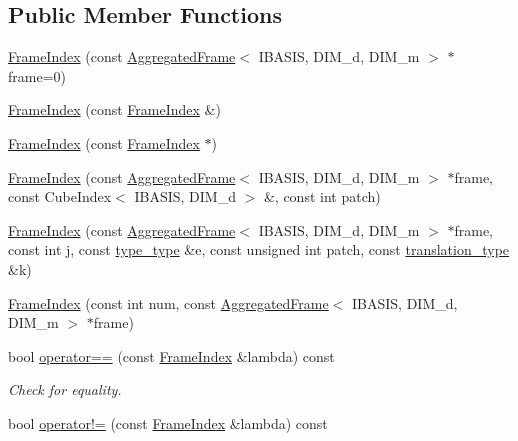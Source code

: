 \subsection*{Public Member Functions}
\begin{CompactItemize}
\item 
\hyperlink{classFrameTL_1_1FrameIndex_3a0967cbcfddd03202189f8610f890c2}{FrameIndex} (const \hyperlink{classFrameTL_1_1AggregatedFrame}{AggregatedFrame}$<$ IBASIS, DIM\_\-d, DIM\_\-m $>$ $\ast$frame=0)
\item 
\hyperlink{classFrameTL_1_1FrameIndex_d4115fc6eafd1487e0ee6c38f21f7cdc}{FrameIndex} (const \hyperlink{classFrameTL_1_1FrameIndex}{FrameIndex} \&)
\item 
\hyperlink{classFrameTL_1_1FrameIndex_2300543ef2fc0fa938f2d8bb53902092}{FrameIndex} (const \hyperlink{classFrameTL_1_1FrameIndex}{FrameIndex} $\ast$)
\item 
\hyperlink{classFrameTL_1_1FrameIndex_38bc47d11409b690b23e93d616e1ca02}{FrameIndex} (const \hyperlink{classFrameTL_1_1AggregatedFrame}{AggregatedFrame}$<$ IBASIS, DIM\_\-d, DIM\_\-m $>$ $\ast$frame, const CubeIndex$<$ IBASIS, DIM\_\-d $>$ \&, const int patch)
\item 
\hyperlink{classFrameTL_1_1FrameIndex_f911f080552f2b21b77625929003b514}{FrameIndex} (const \hyperlink{classFrameTL_1_1AggregatedFrame}{AggregatedFrame}$<$ IBASIS, DIM\_\-d, DIM\_\-m $>$ $\ast$frame, const int j, const \hyperlink{classFrameTL_1_1FrameIndex_e92c4f89e747a61eb2f7275d0bd01e25}{type\_\-type} \&e, const unsigned int patch, const \hyperlink{classFrameTL_1_1FrameIndex_222e44072cf0330c11cd157d4a1ff6a1}{translation\_\-type} \&k)
\item 
\hyperlink{classFrameTL_1_1FrameIndex_a56610938bd08f42df14e503770a89d7}{FrameIndex} (const int num, const \hyperlink{classFrameTL_1_1AggregatedFrame}{AggregatedFrame}$<$ IBASIS, DIM\_\-d, DIM\_\-m $>$ $\ast$frame)
\item 
\hypertarget{classFrameTL_1_1FrameIndex_a56bb8d9bd1015c933ea642842544666}{
bool \hyperlink{classFrameTL_1_1FrameIndex_a56bb8d9bd1015c933ea642842544666}{operator==} (const \hyperlink{classFrameTL_1_1FrameIndex}{FrameIndex} \&lambda) const }
\label{classFrameTL_1_1FrameIndex_a56bb8d9bd1015c933ea642842544666}

\begin{CompactList}\small\item\em Check for equality. \item\end{CompactList}\item 
\hypertarget{classFrameTL_1_1FrameIndex_1ed62dac179cd56eaf20ae5b4b229741}{
bool \hyperlink{classFrameTL_1_1FrameIndex_1ed62dac179cd56eaf20ae5b4b229741}{operator!=} (const \hyperlink{classFrameTL_1_1FrameIndex}{FrameIndex} \&lambda) const }
\label{classFrameTL_1_1FrameIndex_1ed62dac179cd56eaf20ae5b4b229741}


\end{CompactItemize}
